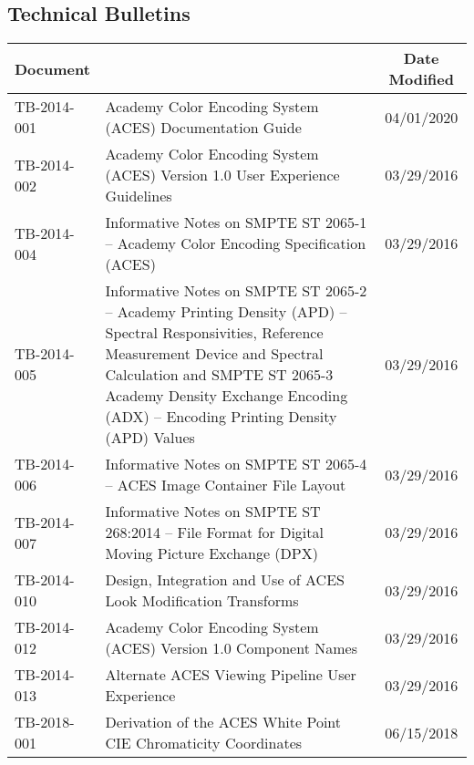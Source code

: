 \documentclass[10pt]{academydoc}
\begin{document}
\subsection*{Technical Bulletins}
\begin{tabularx}{\linewidth}{|l X|c|}
\hline
\textbf{Document} & & \textbf{Date Modified} \\ \hline
TB-2014-001 & Academy Color Encoding System (ACES) Documentation Guide & 04/01/2020 \\ \hline
TB-2014-002 & Academy Color Encoding System (ACES) Version 1.0 User Experience Guidelines & 03/29/2016 \\ \hline
TB-2014-004 & Informative Notes on SMPTE ST 2065-1 -- Academy Color Encoding Specification (ACES) & 03/29/2016 \\ \hline
TB-2014-005 & Informative Notes on SMPTE ST 2065-2 -- Academy Printing Density (APD) -- Spectral Responsivities, Reference Measurement Device and Spectral Calculation and SMPTE ST 2065-3 Academy Density Exchange Encoding (ADX) -- Encoding Printing Density (APD) Values & 03/29/2016 \\ \hline
TB-2014-006 & Informative Notes on SMPTE ST 2065-4 -- ACES Image Container File Layout & 03/29/2016 \\ \hline
TB-2014-007 & Informative Notes on SMPTE ST 268:2014 -- File Format for Digital Moving Picture Exchange (DPX) & 03/29/2016 \\ \hline
TB-2014-010 & Design, Integration and Use of ACES Look Modification Transforms & 03/29/2016 \\ \hline
TB-2014-012 & Academy Color Encoding System (ACES) Version 1.0 Component Names & 03/29/2016 \\ \hline
TB-2014-013 & Alternate ACES Viewing Pipeline User Experience & 03/29/2016 \\ \hline
TB-2018-001 & Derivation of the ACES White Point CIE Chromaticity Coordinates & 06/15/2018 \\ \hline
\end{tabularx}
\end{document}
